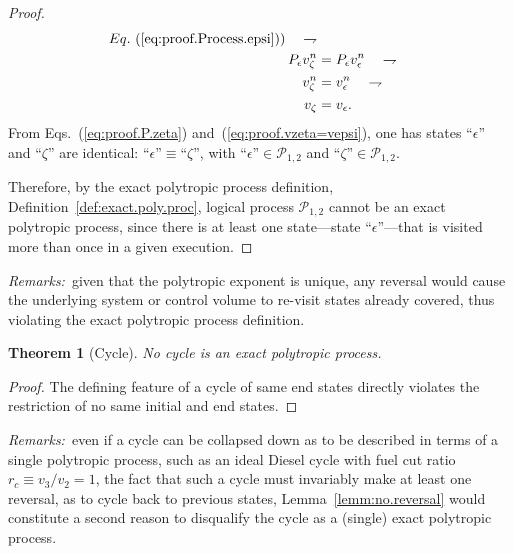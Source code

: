 \documentclass[fleqn,11pt]{SelfArx}
\newtheorem{theorem}{Theorem}
\begin{document}
\begin{proof}
\begin{align}
{            Eq.~(\ref{eq:proof.Process.epsi}))}\quad\rightharpoondown
            \label{eq:proof.Process.zeta} \\
            P_{\epsilon}v_{\zeta}^n & = P_{\epsilon}v_{\epsilon}^n \quad\rightharpoondown \\
            v_{\zeta}^n & = v_{\epsilon}^n \quad\rightharpoondown \\
            v_{\zeta} & = v_{\epsilon}.
            \label{eq:proof.vzeta=vepsi}
        \end{align}
        From  Eqs.~(\ref{eq:proof.P.zeta})  and~(\ref{eq:proof.vzeta=vepsi}),  one  has   states
        ``$\epsilon$''  and  ``$\zeta$''  are  identical:   $\mbox{``}\epsilon\mbox{''}   \equiv
        \mbox{``}\zeta\mbox{''}$, with $\mbox{``}\epsilon\mbox{''}  \in  \mathcal{P}_{1,2}$  and
        $\mbox{``}\zeta\mbox{''} \in \mathcal{P}_{1,2}$.

        Therefore,      by      the       exact       polytropic       process       definition,
        Definition~\ref{def:exact.poly.proc}, logical process $\mathcal{P}_{1,2}$ cannot  be  an
        exact   polytropic   process,   since   there   is   at    least    one    state---state
        ``$\epsilon$''---that is visited more than once in a given execution.
    \end{proof}

    \noindent\textit{Remarks:\/}~given that the polytropic  exponent  is  unique,  any  reversal
    would cause the underlying system or control volume to re-visit states already covered, thus
    violating the exact polytropic process definition.

    \begin{theorem}[Cycle]\label{theo:cycle}
        No cycle is an exact polytropic process.
    \end{theorem}

    \begin{proof}
        The defining feature of a cycle of same end states directly violates the restriction  of
        no same initial and end states.
    \end{proof}

    \noindent\textit{Remarks:\/}~even if a cycle can be collapsed down as  to  be  described  in
    terms of a single polytropic process, such as an ideal Diesel cycle with fuel cut ratio $r_c
    \equiv v_3 / v_2 = 1$, the fact that  such  a  cycle  must  invariably  make  at  least  one
    reversal, as to cycle back to previous states, Lemma~\ref{lemm:no.reversal} would constitute
    a second reason to disqualify the cycle as a (single) exact polytropic process.
\end{document}
